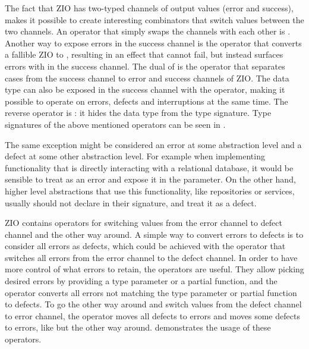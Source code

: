 

The fact that ZIO has two-typed channels of output values (error and success), makes it possible to create interesting combinators that switch values between the two channels. An operator that simply swaps the channels with each other is . Another way to expose errors in the success channel is the  operator that converts a fallible ZIO to , resulting in an effect that cannot fail, but instead surfaces errors with  in the success channel. The dual of  is the operator  that separates  cases from the success channel to error and success channels of ZIO. The  data type can also be exposed in the success channel with the  operator, making it possible to operate on errors, defects and interruptions at the same time. The reverse operator is : it hides the  data type from the type signature. Type signatures of the above mentioned operators can be seen in .



The same exception might be considered an error at some abstraction level and a defect at some other abstraction level. For example when implementing functionality that is directly interacting with a relational database, it would be sensible to treat  as an error and expose it in the  parameter. On the other hand, higher level abstractions that use this functionality, like repositories or services, usually should not declare  in their signature, and treat it as a defect.

ZIO contains operators for switching values from the error channel to defect channel and the other way around. A simple way to convert errors to defects is to consider all errors as defects, which could be achieved with the  operator that switches all errors from the error channel to the defect channel. In order to have more control of what errors to retain, the  operators are useful. They allow picking desired errors by providing a type parameter or a partial function, and the operator converts all errors not matching the type parameter or partial function to defects. To go the other way around and switch values from the defect channel to error channel, the  operator moves all defects to errors and  moves some defects to errors, like  but the other way around.  demonstrates the usage of these operators.


